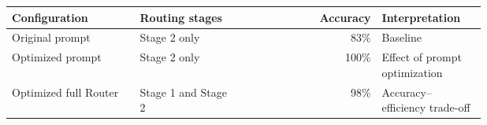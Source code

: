 \begin{center}
\label{tbl:empirical-results}
\small
\begin{tabular}{@{}p{0.27\linewidth}p{0.21\linewidth}rp{0.22\linewidth}@{}}
\toprule
Configuration & Routing stages & Accuracy & Interpretation \\
\midrule
Original prompt & Stage 2 only & 83\% & Baseline \\
Optimized prompt & Stage 2 only & 100\% & Effect of prompt optimization \\
Optimized full Router & Stage 1 and Stage 2 & 98\% & Accuracy--efficiency trade-off \\
\bottomrule
\end{tabular}
\end{center}
